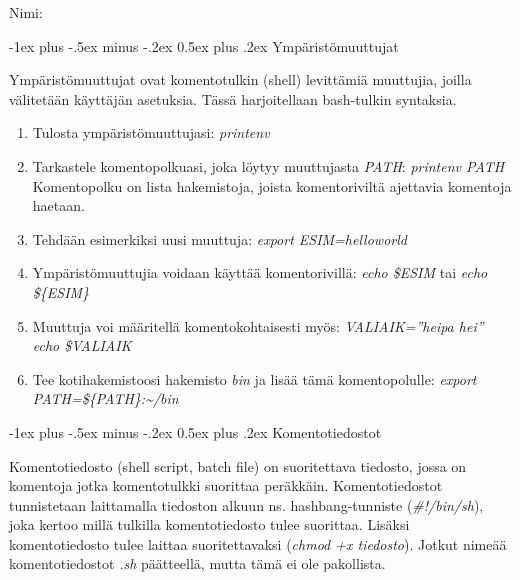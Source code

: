 \documentclass[12pt,portrait,a4]{article}
\makeatletter
\renewcommand{\section}{\@startsection{section}{1}{0mm}%
                                {-1ex plus -.5ex minus -.2ex}%
                                {0.5ex plus .2ex}%
                                {\normalfont\large\bfseries}}
\makeatother
\begin{document}
\raggedbottom

\begin{multicols}{2}
\setlength{\premulticols}{1pt}
\setlength{\postmulticols}{1pt}
\setlength{\multicolsep}{1pt}
\setlength{\columnsep}{2pt}

Nimi:\hrulefill


\end{multicols}

\section{Ympäristömuuttujat}

Ympäristömuuttujat ovat komentotulkin (shell) levittämiä muuttujia, joilla
välitetään käyttäjän asetuksia.  Tässä harjoitellaan bash-tulkin syntaksia.

\begin{enumerate}
\item Tulosta ympäristömuuttujasi: \emph{printenv}
\item Tarkastele komentopolkuasi, joka löytyy muuttujasta \emph{PATH}:
\emph{printenv PATH} \\
Komentopolku on lista hakemistoja, joista komentoriviltä ajettavia komentoja
haetaan.
\item Tehdään esimerkiksi uusi muuttuja: \emph{export ESIM=helloworld}
\item Ympäristömuuttujia voidaan käyttää komentorivillä: \emph{echo \$ESIM}
tai \emph{echo \$\{ESIM\}}
\item Muuttuja voi määritellä komentokohtaisesti myös: \emph{VALIAIK=''heipa
hei'' echo \$VALIAIK}
\item Tee kotihakemistoosi hakemisto \emph{bin} ja lisää tämä
komentopolulle: \emph{export PATH=\$\{PATH\}:\textasciitilde/bin}
\end{enumerate}

\section{Komentotiedostot}

Komentotiedosto (shell script, batch file) on suoritettava tiedosto, jossa
on komentoja jotka komentotulkki suorittaa peräkkäin.  Komentotiedostot
tunnistetaan laittamalla tiedoston alkuun ns. hashbang-tunniste 
(\emph{\#!/bin/sh}), joka kertoo millä tulkilla komentotiedosto tulee
suorittaa.  Lisäksi komentotiedosto tulee laittaa suoritettavaksi
(\emph{chmod +x tiedosto}).  Jotkut nimeää komentotiedostot \emph{.sh}
päätteellä, mutta tämä ei ole pakollista.
\end{document}
